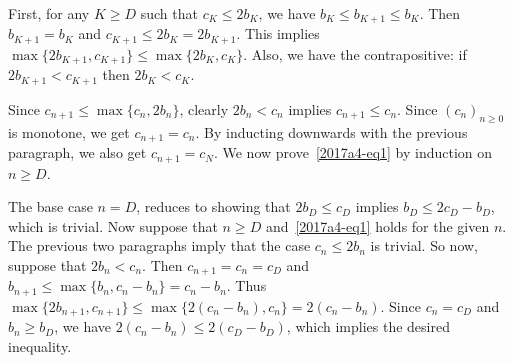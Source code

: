 \documentclass{article}
\begin{document}
First, for any $K \geq D$ such that $c_K \leq 2 b_K$, we have $b_K \leq b_{K + 1} \leq b_K$.
Then $b_{K + 1} = b_K$ and $c_{K + 1} \leq 2 b_K = 2 b_{K + 1}$.
This implies $\max\{2 b_{K + 1}, c_{K + 1}\} \leq \max\{2 b_K, c_K\}$.
Also, we have the contrapositive: if $2 b_{K + 1} < c_{K + 1}$ then $2 b_K < c_K$.

Since $c_{n + 1} \leq \max\{c_n, 2 b_n\}$, clearly $2 b_n < c_n$ implies $c_{n + 1} \leq c_n$.
Since $(c_n)_{n \geq 0}$ is monotone, we get $c_{n + 1} = c_n$.
By inducting downwards with the previous paragraph, we also get $c_{n + 1} = c_N$.
We now prove~\eqref{2017a4-eq1} by induction on $n \geq D$.

The base case $n = D$, reduces to showing that $2 b_D \leq c_D$ implies $b_D \leq 2 c_D - b_D$, which is trivial.
Now suppose that $n \geq D$ and~\eqref{2017a4-eq1} holds for the given $n$.
The previous two paragraphs imply that the case $c_n \leq 2 b_n$ is trivial.
So now, suppose that $2 b_n < c_n$.
Then $c_{n + 1} = c_n = c_D$ and $b_{n + 1} \leq \max\{b_n, c_n - b_n\} = c_n - b_n$.
Thus $\max\{2 b_{n + 1}, c_{n + 1}\} \leq \max\{2 (c_n - b_n), c_n\} = 2 (c_n - b_n)$.
Since $c_n = c_D$ and $b_n \geq b_D$, we have $2 (c_n - b_n) \leq 2 (c_D - b_D)$, which implies the desired inequality.
\end{document}
